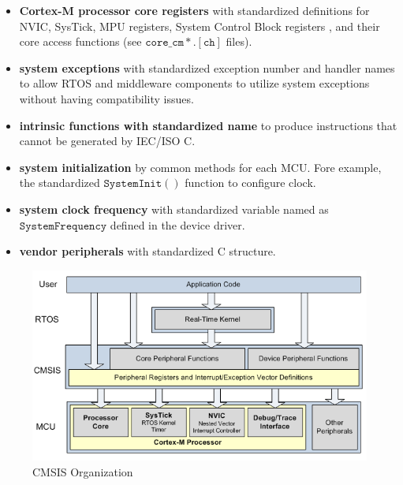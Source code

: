 \begin{itemize}
    \item {\bf Cortex-M processor core registers} with standardized definitions for NVIC, SysTick, MPU registers, System Control Block registers , and their core access functions (see $\mathtt{core\_cm\ast.[ch]}$ files). 
    \item {\bf system exceptions} with standardized exception number and handler names to allow RTOS and middleware components to utilize system exceptions without having compatibility issues.
    \item {\bf intrinsic functions with standardized name} to produce instructions that cannot  be generated by IEC/ISO C. 
    \item {\bf system initialization} by common methods for each MCU. Fore example, the standardized $\mathtt{SystemInit()}$ function to configure clock.
    \item {\bf system clock frequency} with standardized variable named as $\mathtt{SystemFrequency}$ defined in the device driver.
    \item {\bf vendor peripherals} with standardized C structure. 
\end{itemize}
\begin{figure}[ht]
\centerline{\includegraphics[width=5in]{figure/CMSIS2}}
\caption[CMSIS Organization]{CMSIS Organization\cite{keil.mdk.primer}} 
\label{fig_cmsis2}
\end{figure}

